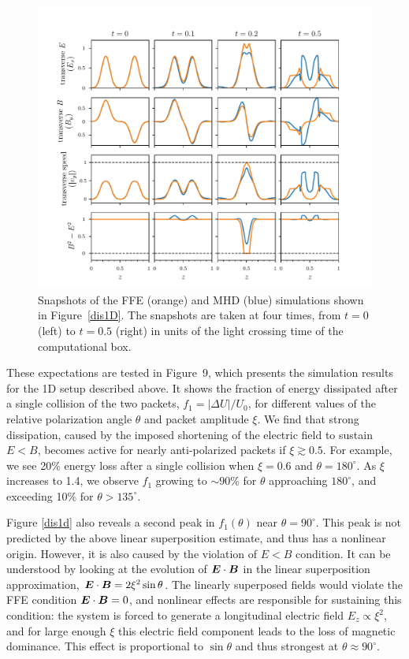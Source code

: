 \begin{figure}[h]
\centering
\includegraphics[width=\textwidth]{pics/chap4/snapshots}
\caption[Snapshots of the FFE and MHD simulations]{
Snapshots of the FFE (orange) and MHD (blue) simulations shown in Figure~\ref{dis1D}. 
The snapshots are taken at four times, from $t=0$ (left) to $t=0.5$ (right) in units of the light crossing time of the computational box. 
}
\label{snapshots}
\end{figure}

These expectations are tested in Figure~9, which presents the simulation results for the 1D setup described above. It shows the fraction of energy dissipated after a single collision of the two packets, $f_1=|\Delta U|/U_0$, for different values of the relative polarization angle $\theta$ and packet amplitude $\xi$. We find that strong dissipation, caused by the imposed shortening of the electric field to sustain $E<B$, becomes active for nearly anti-polarized packets if $\xi \gtrsim 0.5$. For example, we see 20\% energy loss after a single collision when $\xi = 0.6$ and $\theta = 180^\circ$. As $\xi$ increases to 1.4, we observe $f_1$ growing to $\sim 90$\% for $\theta$ approaching $180^\circ$, and exceeding 10\% for $\theta>135^\circ$.
 
Figure \ref{dis1d} also reveals a second peak in $f_1(\theta)$ near $\theta=90^\circ$. This peak is not predicted by the above linear superposition estimate, and thus has a nonlinear origin. However, it is also caused by the violation of $E<B$ condition.
It can be understood by looking at the evolution of $\boldsymbol{E}\cdot \boldsymbol{B}$ in the linear superposition approximation, $\boldsymbol{E}\cdot \boldsymbol{B} = 2\xi^2\sin\theta$. 
The linearly superposed fields would violate the FFE condition $\boldsymbol{E}\cdot \boldsymbol{B}=0$, and nonlinear effects are responsible for sustaining this condition: the system is forced to generate a longitudinal electric field $E_z \propto \xi^2$, and for large enough $\xi$ this electric field component leads to the loss of magnetic dominance. 
This effect is proportional to $\sin\theta$ and thus strongest at $\theta\approx 90^\circ$.

